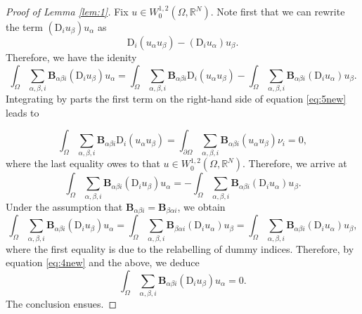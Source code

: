 \documentclass[10pt,a4paper]{amsart}
\begin{document}
\begin{proof}[Proof of Lemma \ref{lem:1}]
Fix $u \in W^{1,2}_0(\Omega, \mathbb{R}^N)$. Note first that we can rewrite the term $(\mathrm{D}_i u_\beta)u_\alpha$ as 
\[
\mathrm{D}_i(u_\alpha u_\beta) - (\mathrm{D}_i u_\alpha)u_\beta. 
\]
Therefore, we have the idenity
\begin{equation}\label{eq:5new}
\int_{\Omega} \sum_{\alpha, \beta, i}\mathbf{B}_{\alpha \beta i} (\mathrm{D}_i u_{\beta}) u_{\alpha} = \int_{\Omega} \sum_{\alpha, \beta, i}\mathbf{B}_{\alpha \beta i} \mathrm{D}_i(u_{\alpha} u_{\beta}) - \int_{\Omega} \sum_{\alpha, \beta, i}\mathbf{B}_{\alpha \beta i} (\mathrm{D}_i u_{\alpha}) u_{\beta}.
\end{equation}
Integrating by parts the first term on the right-hand side of equation \eqref{eq:5new} leads to

\begin{equation}
\int_{\Omega} \sum_{\alpha, \beta, i}\mathbf{B}_{\alpha \beta i} \mathrm{D}_i(u_{\alpha} u_{\beta}) = \int_{\partial \Omega} \sum_{\alpha, \beta, i}\mathbf{B}_{\alpha \beta i}(u_{\alpha} u_{\beta})\nu_i = 0,
\end{equation}
where the last equality owes to that $u \in W^{1,2}_0(\Omega, \mathbb{R}^N)$. Therefore, we arrive at
\begin{equation} \label{eq:4new}
\int_{\Omega} \sum_{\alpha, \beta, i}\mathbf{B}_{\alpha \beta i} (\mathrm{D}_i u_{\beta}) u_{\alpha} = - \int_{\Omega} \sum_{\alpha, \beta, i}\mathbf{B}_{\alpha \beta i} (\mathrm{D}_i u_{\alpha}) u_{\beta}.
\end{equation}
Under the assumption that $\mathbf{B}_{\alpha \beta i} = \mathbf{B}_{\beta \alpha i}$, we obtain
\[
\int_{\Omega} \sum_{\alpha, \beta, i}\mathbf{B}_{\alpha \beta i} (\mathrm{D}_i u_{\beta}) u_{\alpha} = \int_{\Omega} \sum_{\alpha, \beta, i}\mathbf{B}_{\beta \alpha i} (\mathrm{D}_i u_{\alpha}) u_{\beta}= \int_{\Omega} \sum_{\alpha, \beta, i}\mathbf{B}_{\alpha \beta i} (\mathrm{D}_i u_{\alpha}) u_{\beta},
\]
where the first equality is due to the relabelling of dummy indices. Therefore, by equation \eqref{eq:4new} and the above, we deduce
\begin{equation*}
\int_{\Omega} \sum_{\alpha, \beta, i}\mathbf{B}_{\alpha \beta i} (\mathrm{D}_i u_{\beta}) u_{\alpha} = 0.
\end{equation*}
The conclusion ensues.
\end{proof}
\end{document}
